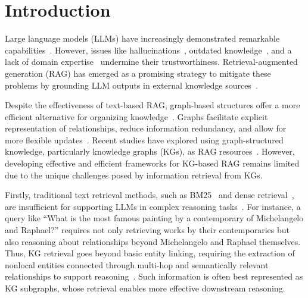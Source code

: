 \section{Introduction}
\label{sec:intro}

Large language models (LLMs) have increasingly demonstrated remarkable capabilities~\citep{NEURIPS2020_1457c0d6, kojima2022large, wei2022chain, bubeck2023sparks, yao2023tree, huang-chang-2023-towards}. However, issues like hallucinations~\citep{10.1145/3571730, huang2023a, zhang2023sirens}, outdated knowledge~\citep{dhingra-etal-2022-time, kasai2023realtime}, and a lack of domain expertise~\citep{li-etal-2023-chatgpt} undermine their trustworthiness. Retrieval-augmented generation (RAG) has emerged as a promising strategy to mitigate these problems by grounding LLM outputs in external knowledge sources~\citep{shuster-etal-2021-retrieval-augmentation, pmlr-v162-borgeaud22a, vu-etal-2024-freshllms, gao2024retrievalaugmented}.

Despite the effectiveness of text-based RAG, graph-based structures offer a more efficient alternative for organizing knowledge~\citep{chein2008graph}. Graphs facilitate explicit representation of relationships, reduce information redundancy, and allow for more flexible updates~\citep{robinson2015graph}. Recent studies have explored using graph-structured knowledge, particularly knowledge graphs (KGs), as RAG resources~\citep{Pan_2024, peng2024graph, edge2024localglobalgraphrag}. However, developing effective and efficient frameworks for KG-based RAG remains limited due to the unique challenges posed by information retrieval from KGs.

Firstly, traditional text retrieval methods, such as BM25~\citep{conf/trec/RobertsonWJHG94, 10.1561/1500000019} and dense retrieval~\citep{karpukhin-etal-2020-dense}, are insufficient for supporting LLMs in complex reasoning tasks~\citep{sun-etal-2018-open}. For instance, a query like ``What is the most famous painting by a contemporary of Michelangelo and Raphael?'' requires not only retrieving works by their contemporaries but also reasoning about relationships beyond Michelangelo and Raphael themselves. Thus, KG retrieval goes beyond basic entity linking, requiring the extraction of nonlocal entities connected through multi-hop and 
 semantically relevant relationships to support reasoning~\citep{jiang2023structgpt, luo2024rog, sun2024think}. Such information is often best represented as KG subgraphs, whose retrieval enables more effective downstream reasoning.

